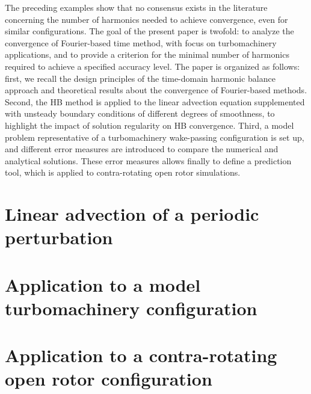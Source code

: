 {The preceding examples show that no consensus exists in the literature 
concerning the number of harmonics needed to achieve convergence,
even for similar configurations.
The goal of the present paper is twofold: to analyze the
convergence of Fourier-based time method, with focus on turbomachinery applications, 
and to provide a criterion for the minimal number of harmonics 
required to achieve a specified accuracy level. The paper is organized as follows: first,
we recall the design principles of the time-domain harmonic balance 
approach and theoretical results about the convergence of Fourier-based methods.
Second, the HB method is applied to the linear advection equation 
supplemented with unsteady boundary conditions of different degrees of smoothness,
to highlight the impact of solution regularity on HB convergence. 
Third, a model problem representative of a turbomachinery wake-passing 
configuration is set up, and different
error measures are introduced to compare the numerical and analytical solutions. 
These error measures allows finally to define a prediction tool, 
which is applied to contra-rotating open rotor simulations.
}

\minitoc
\newpage

\section{Linear advection of a periodic perturbation}
\label{sec:convergence_advection}


\section{Application to a model turbomachinery configuration}
\label{sec:rotating_blocks}


\section{Application to a contra-rotating open rotor configuration}
\label{sec:CROR}


\chconclu{}

